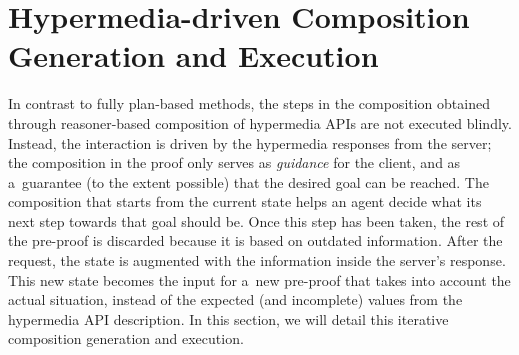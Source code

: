 \section{Hypermedia-driven Composition Generation and Execution}
\label{sec:Composition}
In contrast to fully plan-based methods,
the steps in the composition obtained through reasoner-based composition of hypermedia APIs
are not executed blindly.
Instead, the interaction is driven by the hypermedia responses from the server;
the composition in the proof only serves as \emph{guidance} for the client,
and as a~guarantee (to the extent possible) that the desired goal can be reached.
The composition that starts from the current state
helps an agent decide what its next step towards that goal should be.
Once this step has been taken, the rest of the pre-proof is discarded
because it is based on outdated information.
After the request,
the state is augmented with the information inside the server's response.
This new state becomes the input for a~new pre-proof
that takes into account the actual situation,
instead of the expected (and incomplete) values from the hypermedia API description.
In this section, we will detail this iterative composition generation
and execution.

